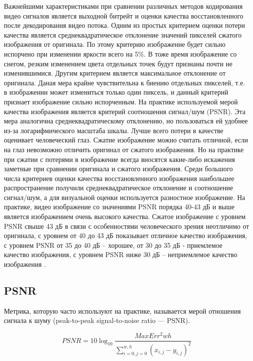Важнейшими характеристиками при сравнении различных методов
кодирования видео сигналов является выходной битрейт и оценки качества
восстановленного после декодирования видео потока. 
Одним из простых критерием оценки потери качества является
среднеквадратическое отклонение значений пикселей сжатого изображения от
оригинала.
По этому критерию изображение будет сильно испорчено при изменении
яркости всего на 5\%. В тоже время изображение со снегом, резким изменением
цвета отдельных точек будут признаны почти не изменившимися.
Другим критерием является максимальное отклонение от оригинала.
Даная мера крайне чувствительна к биению отдельных пикселей, т.е. в
изображении может измениться только один пиксель, и данный критерий
признает изображение сильно испорченным.
На практике используемой мерой качества изображения является
критерий соотношения сигнал/шум (PSNR). Эта мера аналогична
среднеквадратическому отклонению, но пользоваться ей удобнее из-за
логарифмического масштаба шкалы.
Лучше всего потери в качестве оценивает человеческий глаз. Сжатие
изображение можно считать отличной, если на глаз невозможно отличить
оригинал от сжатого изображения. Но на практике при сжатии с потерями в
изображение всегда вносятся какие-либо искажения заметные при сравнении
оригинала и сжатого изображения.
Среди большого числа критериев оценки качества восстановленного
изображения наибольшее распространение получили среднеквадратическое
отклонение и соотношение сигнал/шум, а для визуальной оценки используется
разностное изображение.
На практике, видео изображение со значениями PSNR порядка 40-43 дБ и
выше является изображением очень высокого качества. Сжатое изображение с
уровнем PSNR свыше 43 дБ в связи с особенностями человеческого зрения
неотличимо от оригинала, с уровнем от 40 до 43 дБ показывает отличное
качество изображения, с уровнем PSNR от 35 до 40 дБ – хорошее, от 30 до 35
дБ - приемлемое качество изображения, с уровнем PSNR ниже 30 дБ –
неприемлемое качество изображения \cite{Pup02}.

\subsection{PSNR}

Метрика, которую часто используют на практике, называется мерой отношения сигнала 
к шуму (peak-to-peak signal-to-noise ratio — PSNR).

\begin{equation}\label{eq:psnr}
PSNR = 10\log_{10}\frac{MaxErr^{2}wh}{\sum_{i = 0, j = 0}^{w,h}(x_{i,j}-y_{i,j})^2}
\end{equation}

